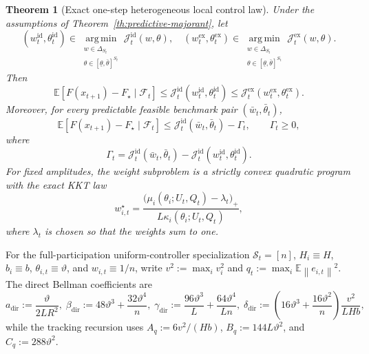 \documentclass{article}
\newtheorem{theorem}{Theorem}[section]
\theoremstyle{definition}
\newcommand{\EE}{\mathbb E}
\newcommand{\cF}{\mathcal F}
\newcommand{\argmin}{\operatorname*{arg\,min}}
\newcommand{\norm}[1]{\left\lVert #1\right\rVert}
\begin{document}
\begin{theorem}[Exact one-step heterogeneous local control law]
\label{th:one-step-hetero}
Under the assumptions of Theorem~\ref{th:predictive-majorant}, let
\[
(w_t^{\mathrm{id}},\theta_t^{\mathrm{id}})
\in
\argmin_{\substack{w\in\Delta_{S_t}\\ \theta\in[\underline\theta,\bar\theta]^{S_t}}}
\mathcal J_t^{\mathrm{id}}(w,\theta),\quad(w_t^{\mathrm{ex}},\theta_t^{\mathrm{ex}})
\in
\argmin_{\substack{w\in\Delta_{S_t}\\ \theta\in[\underline\theta,\bar\theta]^{S_t}}}
\mathcal J_t^{\mathrm{ex}}(w,\theta).
\]
Then
\begin{equation}
\EE[F(x_{t+1})-F_\star\mid \cF_t]
\le
\mathcal J_t^{\mathrm{id}}(w_t^{\mathrm{id}},\theta_t^{\mathrm{id}})
\le
\mathcal J_t^{\mathrm{ex}}(w_t^{\mathrm{ex}},\theta_t^{\mathrm{ex}}).
\label{eq:one-step-control-law}\end{equation}
Moreover, for every predictable feasible benchmark pair
$(\bar w_t,\bar\theta_t)$,
\[
\EE[F(x_{t+1})-F_\star\mid \cF_t]
\le
\mathcal J_t^{\mathrm{id}}(\bar w_t,\bar\theta_t)-\Gamma_t,
\qquad
\Gamma_t\ge 0,
\]
where
\[
\Gamma_t
=
\mathcal J_t^{\mathrm{id}}(\bar w_t,\bar\theta_t)
-
\mathcal J_t^{\mathrm{id}}(w_t^{\mathrm{id}},\theta_t^{\mathrm{id}}).
\]
For fixed amplitudes, the weight subproblem is a strictly convex quadratic
program with the exact KKT law
\[
w_{i,t}^\star
=
\frac{\bigl(\mu_i(\theta_i;U_t,Q_t)-\lambda_t\bigr)_+}
{L\kappa_i(\theta_i;U_t,Q_t)},
\]
where $\lambda_t$ is chosen so that the weights sum to one.
\end{theorem}
For the full-participation uniform-controller specialization $\mathcal S_t=[n]$, $H_i\equiv H$, $b_i\equiv b$, $\theta_{i,t}\equiv\vartheta$, and $w_{i,t}\equiv 1/n$, write $v^2:=\max_i v_i^2$ and $q_t:=\max_i\EE\norm{e_{i,t}}^2$. The direct Bellman coefficients are
\begin{equation*}
a_{\mathrm{dir}}:=\frac{\vartheta}{2LR^2},\; \beta_{\mathrm{dir}}:=48\vartheta^3+\frac{32\vartheta^4}{n},\; \gamma_{\mathrm{dir}}:=\frac{96\vartheta^3}{L}+\frac{64\vartheta^4}{Ln},\; \delta_{\mathrm{dir}}:=\left(16\vartheta^3+\frac{16\vartheta^2}{n}\right)\frac{v^2}{L H b},
\end{equation*}
while the tracking recursion uses $A_q:=6v^2/(Hb)$, $B_q:=144L\vartheta^2$, and $C_q:=288\vartheta^2$.
\end{document}
